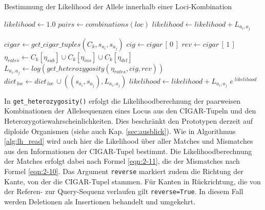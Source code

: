 \begin{algorithm}[H]
	\caption{Bestimmung der Likelihood der Allele innerhalb einer Loci-Kombination}  \label{alg:lh_loci}
	\begin{algorithmic}[1]	
		\State $ likelihood \gets 1.0 $
		    \State $ pairs \gets combinations(loc) $
		    \State $likelihood \gets likelihood + L_{a_{i}, a_{j}} $

		    \Else
		    
		    
		    
		    \State $cigar \gets get\_cigar\_tuples(C_{k}, s_{a_{i}}, s_{a_{j}})$  
			        \State $cig \gets cigar\,[\,0\,]$
			        \State $rev \gets cigar\,[\,1\,]$
			        \State $ \eta_{rates} \gets C_{k}[\eta_{sub}] \cup C_{k}[\eta_{ins}] \cup C_{k}[\eta_{del}]$
			        \State $L_{a_{i}, a_{j}} \gets log(get\_heterozygosity(\eta_{rates}, cig, rev))$  
			        \State $ dict_{\,loc} \gets dict_{\,loc} \, \cup ((s_{a_{i}}, s_{a_{j}}),  L_{a_{i}, a_{j}})  $
			    	\State $ likelihood \gets likelihood + L_{a_{i}, a_{j}}$    
			        \EndIf
			\EndIf
			\EndFor
		\EndFor
		\State \Return $ e^{\;likelihood} $
		\EndFunction
	\end{algorithmic}
\end{algorithm}

In \lstinline|get_heterozygosity()| erfolgt die Likelihoodberechnung der paarweisen Kombinationen der Allelsequenzen eines Locus aus den CIGAR-Tupeln und den Heterozygotiewahrscheinlichkeiten. Dies beschränkt den Prototypen derzeit auf diploide Organismen (siehe auch Kap. \ref{sec:ausblick}). Wie in Algorithmus \ref{alg:lh_read} wird auch hier die Likelihood über aller Matches und Mismatches aus den Informationen der CIGAR-Tupel bestimmt. Die Likelihoodberechnung der Matches erfolgt dabei nach Formel \ref{eqn:2-11}, die der Mismatches nach Formel \ref{eqn:2-10}. Das Argument \lstinline|reverse| markiert zudem die Richtung der Kante, von der die CIGAR-Tupel stammen. Für  Kanten in Rückrichtung, die von der Referen- zur Query-Sequenz verlaufen gilt \lstinline|reverse=True|. In diesem Fall werden Deletionen als Insertionen behandelt und umgekehrt. \\

